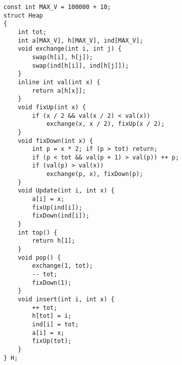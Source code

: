 \begin{lstlisting}
const int MAX_V = 100000 + 10;
struct Heap
{
	int tot;
	int a[MAX_V], h[MAX_V], ind[MAX_V];
	void exchange(int i, int j) {
		swap(h[i], h[j]);
		swap(ind[h[i]], ind[h[j]]);
	}
	inline int val(int x) {
		return a[h[x]];
	}
	void fixUp(int x) {
		if (x / 2 && val(x / 2) < val(x)) 
			exchange(x, x / 2), fixUp(x / 2);
	}
	void fixDown(int x) {
		int p = x * 2; if (p > tot) return;
		if (p < tot && val(p + 1) > val(p)) ++ p;
		if (val(p) > val(x))
			exchange(p, x), fixDown(p);
	}
	void Update(int i, int x) {
		a[i] = x;
		fixUp(ind[i]);
		fixDown(ind[i]);
	}
	int top() {
		return h[1];
	}
	void pop() {
		exchange(1, tot);
		-- tot;
		fixDown(1);
	}
	void insert(int i, int x) {
		++ tot;
		h[tot] = i;
		ind[i] = tot;
		a[i] = x;
		fixUp(tot);
	}
} H;
\end{lstlisting}
